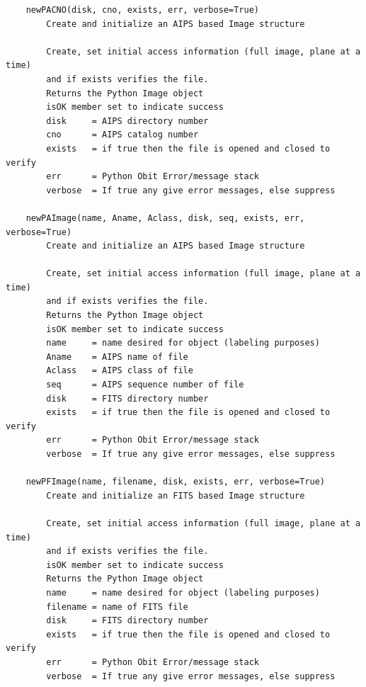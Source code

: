 \documentclass[11pt]{report}
\begin{document}
\begin{verbatim}
    newPACNO(disk, cno, exists, err, verbose=True)
        Create and initialize an AIPS based Image structure
        
        Create, set initial access information (full image, plane at a time)
        and if exists verifies the file.
        Returns the Python Image object
        isOK member set to indicate success
        disk     = AIPS directory number
        cno      = AIPS catalog number
        exists   = if true then the file is opened and closed to verify
        err      = Python Obit Error/message stack
        verbose  = If true any give error messages, else suppress
    
    newPAImage(name, Aname, Aclass, disk, seq, exists, err, verbose=True)
        Create and initialize an AIPS based Image structure
        
        Create, set initial access information (full image, plane at a time)
        and if exists verifies the file.
        Returns the Python Image object
        isOK member set to indicate success
        name     = name desired for object (labeling purposes)
        Aname    = AIPS name of file
        Aclass   = AIPS class of file
        seq      = AIPS sequence number of file
        disk     = FITS directory number
        exists   = if true then the file is opened and closed to verify
        err      = Python Obit Error/message stack
        verbose  = If true any give error messages, else suppress
    
    newPFImage(name, filename, disk, exists, err, verbose=True)
        Create and initialize an FITS based Image structure
        
        Create, set initial access information (full image, plane at a time)
        and if exists verifies the file.
        isOK member set to indicate success
        Returns the Python Image object
        name     = name desired for object (labeling purposes)
        filename = name of FITS file
        disk     = FITS directory number
        exists   = if true then the file is opened and closed to verify
        err      = Python Obit Error/message stack
        verbose  = If true any give error messages, else suppress

\end{verbatim}
\end{document}

